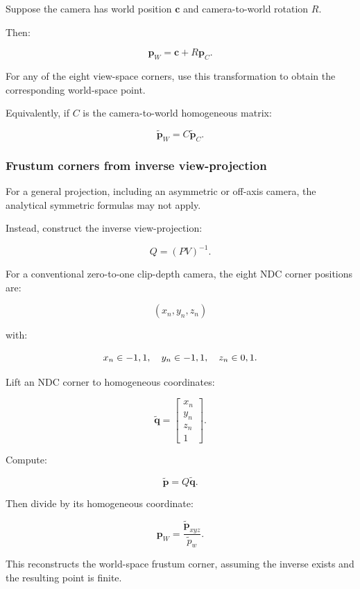 Suppose the camera has world position \(\mathbf c\) and camera-to-world rotation \(R\).

Then:

\[
 \boxed{ \mathbf p_W=\mathbf c+R\mathbf p_C }.
\]

For any of the eight view-space corners, use this transformation to obtain the corresponding world-space point.

Equivalently, if \(C\) is the camera-to-world homogeneous matrix:

\[
 \boxed{ \tilde{\mathbf p}_W=C\tilde{\mathbf p}_C }.
\]

\subsubsection{Frustum corners from inverse view-projection}\label{frustum-corners-from-inverse-view-projection}

For a general projection, including an asymmetric or off-axis camera, the analytical symmetric formulas may not apply.

Instead, construct the inverse view-projection:

\[
 \boxed{ Q=(PV)^{-1} }.
\]

For a conventional zero-to-one clip-depth camera, the eight NDC corner positions are:

\[
 (x_n,y_n,z_n)
\]

with:

\[
 x_n\in\\{-1,1\\},\quad y_n\in\\{-1,1\\},\quad z_n\in\\{0,1\\}.
\]

Lift an NDC corner to homogeneous coordinates:

\[
 \tilde{\mathbf q}= \begin{bmatrix}x_n\\y_n\\z_n\\1\end{bmatrix}.
\]

Compute:

\[
 \tilde{\mathbf p}=Q\tilde{\mathbf q}.
\]

Then divide by its homogeneous coordinate:

\[
 \boxed{ \mathbf p_W= \frac{\tilde{\mathbf p}_{xyz}}{\tilde p_w} }.
\]

This reconstructs the world-space frustum corner, assuming the inverse exists and the resulting point is finite.


